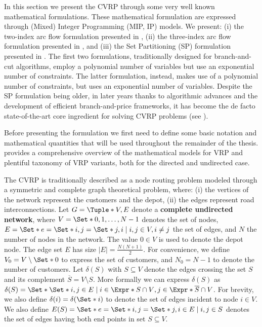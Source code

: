 In this section we present the CVRP through some very well known mathematical formulations.
These mathematical formulation are expressed through (Mixed) Integer Programming (MIP, IP)
models.
We present:
(i) the two-index arc flow formulation presented in \textcite{laporte1983, laporte1985, laporte1986},
(ii) the three-index arc flow formulation presented in \textcite{toth2002},
and (iii) the Set Partitioning (SP) formulation presented in \textcite{balinski1964}.
The first two formulations, traditionally designed
for branch-and-cut algorithms, employ a polynomial number of variables
but use an exponential number of constraints.
The latter formulation, instead, makes use of a polynomial number of constraints,
but uses an exponential number of variables.
Despite the SP formulation being older, in later years thanks to algorithmic advances
and the development of efficient branch-and-price frameworks, it has become the de facto
state-of-the-art core ingredient for solving CVRP problems (see \cite{pessoa2020}).

Before presenting the formulation we first need to define some basic notation
and mathematical quantities that will be used throughout the remainder of the thesis.
\textcite{toth2002, toth2014} provides a comprehensive overview of the mathematical models
for VRP and plentiful taxonomy of VRP variants, both for the directed and undirected case.

\medskip

The CVRP is traditionally described as a node routing problem modeled through a symmetric and complete graph theoretical problem,
where: (i) the vertices of the network represent the customers and the depot,
(ii) the edges represent road interconnections.
Let $G = \Tuple*{V, E}$ denote a \textbf{complete undirected network}, where $V = \Set*{0, 1, \dots, N - 1}$ denotes the set of nodes,
$E = \Set*{e = \Set*{i, j} = \Set*{j, i} \mid \allowbreak i,j \in V, \allowbreak i \ne j}$ the set of edges, and $N$ the number of nodes in the network.
The value $0 \in V$ is used to denote the depot node.
The edge set $E$ has size $|E| = \frac{N (N+1)}{2}$.
For convenience, we define $V_0 = V \setminus \Set*{0}$ to express the set of customers, and $N_0 = N - 1$ to denote the number of customers.
Let $\delta(S)$ with $S \subseteq V$ denote the edges crossing the set $S$ and its complement $\overline{S} = V \setminus S$.
More formally we can express $\delta(S)$ as $\delta(S) = \Set*{ \Set*{i, j} \in E \mid i \in \Expr*{S \cap V}, j \in \Expr*{ \overline{S} \cap V } }$.
For brevity, we also define $\delta(i) = \delta(\Set*{i})$ to denote the set of edges incident to node $i \in V$.
We also define $E(S) = \Set*{e = \Set*{i, j} = \Set*{j, i}\in E \mid i, j \in S}$ denotes the set of edges having both end points in set $S \subseteq V$.

